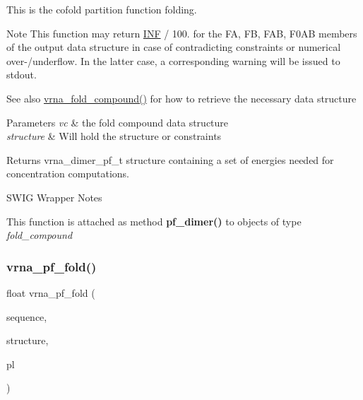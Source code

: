 This is the cofold partition function folding.

\begin{DoxyNote}{Note}
This function may return \hyperlink{constants_8h_a12c2040f25d8e3a7b9e1c2024c618cb6}{I\+NF} / 100. for the {\ttfamily FA}, {\ttfamily FB}, {\ttfamily F\+AB}, {\ttfamily F0\+AB} members of the output data structure in case of contradicting constraints or numerical over-\//underflow. In the latter case, a corresponding warning will be issued to {\ttfamily stdout}.
\end{DoxyNote}
\begin{DoxySeeAlso}{See also}
\hyperlink{group__fold__compound_ga6601d994ba32b11511b36f68b08403be}{vrna\+\_\+fold\+\_\+compound()} for how to retrieve the necessary data structure
\end{DoxySeeAlso}

\begin{DoxyParams}{Parameters}
{\em vc} & the fold compound data structure \\
\hline
{\em structure} & Will hold the structure or constraints \\
\hline
\end{DoxyParams}
\begin{DoxyReturn}{Returns}
vrna\+\_\+dimer\+\_\+pf\+\_\+t structure containing a set of energies needed for concentration computations.
\end{DoxyReturn}
\begin{DoxyRefDesc}{S\+W\+I\+G Wrapper Notes}
\item[\hyperlink{wrappers__wrappers000090}{S\+W\+I\+G Wrapper Notes}]This function is attached as method {\bfseries pf\+\_\+dimer()} to objects of type {\itshape fold\+\_\+compound} \end{DoxyRefDesc}
\mbox{\label{group__part__func__global_gac4a2a74a79e49818bc35412a2b392c7e}} 
\subsubsection{\texorpdfstring{vrna\+\_\+pf\+\_\+fold()}{vrna\_pf\_fold()}}
{\footnotesize\ttfamily float vrna\+\_\+pf\+\_\+fold (\begin{DoxyParamCaption}\item[{const char $\ast$}]{sequence,  }\item[{char $\ast$}]{structure,  }\item[{\hyperlink{group__struct__utils__plist_gab9ac98ab55ded9fb90043b024b915aca}{vrna\+\_\+ep\+\_\+t} $\ast$$\ast$}]{pl }\end{DoxyParamCaption})}



